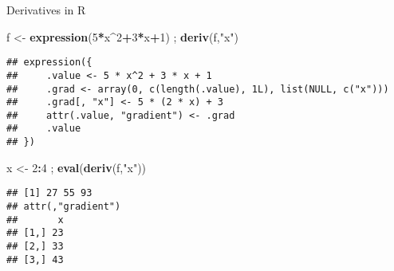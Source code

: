 \documentclass[8pt,ignorenonframetext,]{beamer}
\newenvironment{Shaded}{\begin{snugshade}}{\end{snugshade}}
\newcommand{\KeywordTok}[1]{\textcolor[rgb]{0.13,0.29,0.53}{\textbf{#1}}}
\newcommand{\DecValTok}[1]{\textcolor[rgb]{0.00,0.00,0.81}{#1}}
\newcommand{\StringTok}[1]{\textcolor[rgb]{0.31,0.60,0.02}{#1}}
\newcommand{\OperatorTok}[1]{\textcolor[rgb]{0.81,0.36,0.00}{\textbf{#1}}}
\newcommand{\NormalTok}[1]{#1}
\begin{document}
\begin{frame}[fragile]{Derivatives in R}

\begin{Shaded}
\begin{Highlighting}[]
\NormalTok{f <-}\StringTok{ }\KeywordTok{expression}\NormalTok{(}\DecValTok{5}\OperatorTok{*}\NormalTok{x}\OperatorTok{^}\DecValTok{2}\OperatorTok{+}\DecValTok{3}\OperatorTok{*}\NormalTok{x}\OperatorTok{+}\DecValTok{1}\NormalTok{) ; }\KeywordTok{deriv}\NormalTok{(f,}\StringTok{"x"}\NormalTok{)}
\end{Highlighting}
\end{Shaded}

\begin{verbatim}
## expression({
##     .value <- 5 * x^2 + 3 * x + 1
##     .grad <- array(0, c(length(.value), 1L), list(NULL, c("x")))
##     .grad[, "x"] <- 5 * (2 * x) + 3
##     attr(.value, "gradient") <- .grad
##     .value
## })
\end{verbatim}

\begin{Shaded}
\begin{Highlighting}[]
\NormalTok{x <-}\StringTok{ }\DecValTok{2}\OperatorTok{:}\DecValTok{4}\NormalTok{ ; }\KeywordTok{eval}\NormalTok{(}\KeywordTok{deriv}\NormalTok{(f,}\StringTok{"x"}\NormalTok{))}
\end{Highlighting}
\end{Shaded}

\begin{verbatim}
## [1] 27 55 93
## attr(,"gradient")
##       x
## [1,] 23
## [2,] 33
## [3,] 43
\end{verbatim}

\end{frame}
\end{document}
